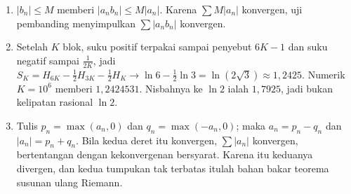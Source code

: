 \begin{enumerate}[label=\textbf{5.\arabic*}]
  \item $|b_{n}|\le M$ memberi $|a_{n}b_{n}|\le M|a_{n}|$. Karena $\sum M|a_{n}|$
        konvergen, uji pembanding menyimpulkan $\sum|a_{n}b_{n}|$ konvergen.

  \item Setelah $K$ blok, suku positif terpakai sampai penyebut $6K-1$ dan suku
        negatif sampai $\frac{1}{2K}$, jadi
        $S_{K}=H_{6K}-\frac12H_{3K}-\frac12H_{K}\to\ln6-\frac12\ln3=\ln(2\sqrt3)
        \approx1{,}2425$. Numerik $K=10^{6}$ memberi $1{,}2424531$. Nisbahnya ke
        $\ln2$ ialah $1{,}7925$, jadi bukan kelipatan rasional $\ln2$.

  \item Tulis $p_{n}=\max(a_{n},0)$ dan $q_{n}=\max(-a_{n},0)$; maka
        $a_{n}=p_{n}-q_{n}$ dan $|a_{n}|=p_{n}+q_{n}$. Bila kedua deret itu
        konvergen, $\sum|a_{n}|$ konvergen, bertentangan dengan kekonvergenan
        bersyarat. Karena itu keduanya divergen, dan kedua tumpukan tak terbatas
        itulah bahan bakar teorema susunan ulang Riemann.
\end{enumerate}
